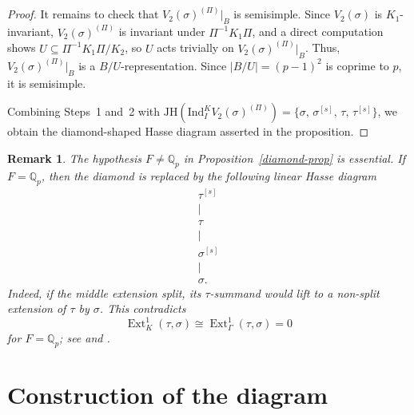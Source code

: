 \documentclass[a4paper,10pt,twoside]{amsart}
\DeclareMathOperator{\Ext}{Ext}
\newtheorem{remark}[theorem]{Remark}
\theoremstyle{definition}
\numberwithin{equation}{section}
\begin{document}
\begin{proof}
It remains to check that $V_2(\sigma)^{(\Pi)}|_B$ is semisimple. Since $V_2(\sigma)$ is
$K_1$-invariant, $V_2(\sigma)^{(\Pi)}$ is invariant under $\Pi^{-1} K_1\Pi$, and a direct computation shows $U \subseteq \Pi^{-1} K_1\Pi/K_2$,
so $U$ acts trivially on $V_2(\sigma)^{(\Pi)}|_B$. Thus, $V_2(\sigma)^{(\Pi)}|_B$ is a $B/U$-representation. Since $|B/U| = (p-1)^2$ is coprime to $p$, it is semisimple.

\medskip
Combining Steps~1 and~2 with $\mathrm{JH}(\mathrm{Ind}_I^K V_2(\sigma)^{(\Pi)}) = \{\sigma,\,
\sigma^{[s]},\, \tau,\, \tau^{[s]}\}$, we obtain the diamond-shaped
Hasse diagram asserted in the proposition.
\end{proof}


\begin{remark}\label{rmk:Qp}
The hypothesis \(F\neq\mathbb Q_p\) in Proposition~\ref{diamond-prop} is
essential. If \(F=\mathbb Q_p\), then the diamond is replaced by the following linear Hasse diagram
\[
\begin{matrix}
\tau^{[s]}\\
\vert\\
\tau\\
\vert\\
\sigma^{[s]}\\
\vert\\
\sigma.
\end{matrix}
\]
Indeed, if the middle extension split, its \(\tau\)-summand would lift to a
non-split extension of \(\tau\) by \(\sigma\). This contradicts
\[
\Ext^1_K(\tau,\sigma)
\cong
\Ext^1_\Gamma(\tau,\sigma)
=
0
\]
for \(F=\mathbb Q_p\); see \cite[Lemma~2.10(ii)]{HuWang} and
\cite[Corollary~5.6(i)]{BP12}.
\end{remark}

\section{Construction of the diagram}
\end{document}
